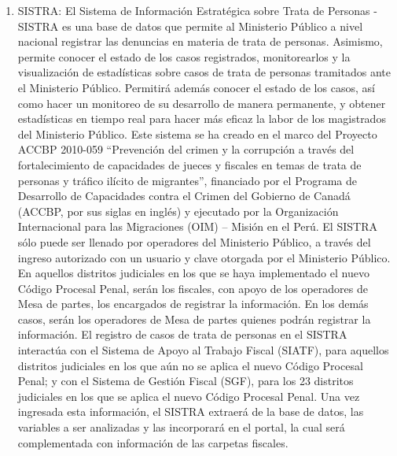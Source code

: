 \documentclass{article}
\begin{document}
\begin{enumerate}
\item SISTRA: El Sistema de Información Estratégica sobre Trata de Personas - SISTRA es una base de datos que permite al Ministerio Público a nivel nacional registrar las denuncias en materia de trata de personas. Asimismo, permite conocer el estado de los casos registrados, monitorearlos y la visualización de estadísticas sobre casos de trata de personas tramitados ante el Ministerio Público. Permitirá además conocer el estado de los casos, así como hacer un monitoreo de su desarrollo de manera permanente, y obtener estadísticas en tiempo real para hacer más eficaz la labor de los magistrados del Ministerio Público. Este sistema se ha creado en el marco del Proyecto ACCBP 2010-059 “Prevención del crimen y la corrupción a través del fortalecimiento de capacidades de jueces y fiscales en temas de trata de personas y tráfico ilícito de migrantes”, financiado por el Programa de Desarrollo de Capacidades contra el Crimen del Gobierno de Canadá (ACCBP, por sus siglas en inglés) y ejecutado por la Organización Internacional para las Migraciones (OIM) – Misión en el Perú. El SISTRA sólo puede ser llenado por operadores del Ministerio Público, a través del ingreso autorizado con un usuario y clave otorgada por el Ministerio Público. En aquellos distritos judiciales en los que se haya implementado el nuevo Código Procesal Penal, serán los fiscales, con apoyo de los operadores de Mesa de partes, los encargados de registrar la información. En los demás casos, serán los operadores de Mesa de partes quienes podrán registrar la información. El registro de casos de trata de personas en el SISTRA interactúa con el Sistema de Apoyo al Trabajo Fiscal (SIATF), para aquellos distritos judiciales en los que aún no se aplica el nuevo Código Procesal Penal; y con el Sistema de Gestión Fiscal (SGF), para los 23 distritos judiciales en los que se aplica el nuevo Código Procesal Penal. Una vez ingresada esta información, el SISTRA extraerá de la base de datos, las variables a ser analizadas y las incorporará en el portal, la cual será complementada con información de las carpetas fiscales.
\end{enumerate}
\end{document}
